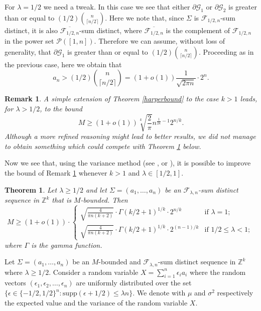 \documentclass[a4paper]{amsart}
\theoremstyle{plain}
\newtheorem{Remark}[Definition]{Remark}
\newtheorem{Theorem}[Definition]{Theorem}
\begin{document}
For $\lambda = 1/2$ we need a tweak. In this case we see that either $\partial \mathcal{G}_1$ or $\partial \mathcal{G}_2$ is greater than or equal to $(1/2) {\binom{n}{\lceil n/2 \rceil}}$. Here we note that, since $\Sigma$ is $\mathcal{F}_{1/2,n}$-sum distinct, it is also $\overline{\mathcal{F}_{1/2,n}}$-sum distinct, where $\overline{\mathcal{F}_{1/2,n}}$ is the complement of $\mathcal{F}_{1/2,n}$ in the power set $\mathcal{P}([1,n])$. Therefore we can assume, without loss of generality, that $\partial \mathcal{G}_1$ is greater than or equal to $(1/2) {\binom{n}{\lceil n/2 \rceil}}$. Proceeding as in the previous case, here we obtain that
$$ a_n>(1/2)\binom{n}{\lceil n/2 \rceil}=(1 + o(1))\frac{1}{\sqrt{2\pi n}} \cdot 2^n.$$
\endproof
\begin{Remark}\label{rem:harper}
A simple extension of Theorem \ref{harperbound} to the case $k>1$ leads, for $\lambda > 1/2$, to the bound
$$
M \geq (1+o(1)) \sqrt[k]{\frac{2}{\pi}} n^{\frac{1}{2k}-1} 2^{n/k}.
$$
Although a more refined reasoning might lead to better results, we did not manage to obtain something which could compete with Theorem \ref{teo:multidimguy} below.
\end{Remark}
Now we see that, using the variance method (see \cite{Alon2}, \cite{Erdos} or \cite{Guy}), it is possible to improve the bound of Remark \ref{rem:harper} whenever $k>1$ and $\lambda \in [1/2, 1]$.
\begin{Theorem}\label{teo:multidimguy}
Let $\lambda \geq 1/2$ and let $\Sigma=(a_1,\dots,a_n)$ be an
$\mathcal{F}_{\lambda,n}$-sum distinct sequence in $\mathbb{Z}^k$ that is $M$-bounded. Then
$$
M \geq (1+o(1)) \cdot \begin{cases} \sqrt{\frac{4}{\pi n (k+2)}} \cdot \Gamma(k/2+1)^{1/k} \cdot 2^{n/k} & \text{if } \lambda=1; \\
\sqrt{\frac{4}{\pi n (k+2)}} \cdot \Gamma(k/2+1)^{1/k} \cdot 2^{(n-1)/k} & \text{if } 1/2 \leq \lambda < 1; \end{cases}\,
$$
where $\Gamma$ is the gamma function.
\end{Theorem}
\proof
Let $\Sigma=(a_1,\dots,a_n)$ be an $M$-bounded and $\mathcal{F}_{\lambda,n}$-sum distinct sequence in $\mathbb{Z}^k$ where $\lambda\geq 1/2$.
Consider a random variable $X = \sum_{i=1}^n \epsilon_i a_i$ where the random vectors $(\epsilon_1, \epsilon_2, \ldots, \epsilon_n)$ are uniformly distributed over the set $\{ \epsilon \in \{-1/2, 1/2\}^n : \text{supp}(\epsilon+1/2) \leq \lambda n \}$. We denote with $\mu$ and $\sigma^2$ respectively the expected value and the variance of the random variable $X$.
\end{document}

